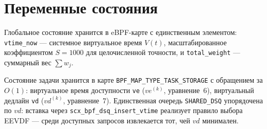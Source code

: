 \documentclass[12pt, oneside]{book}
\newenvironment{customquote}
{\list{}{\leftmargin=0.5cm
                \rightmargin=0.5cm
                \topsep=0pt
                \partopsep=0pt
                \parsep=2pt
                \itemsep=0pt
        }%
        \normalfont\relax
\item\relax}
{\endlist}
\begin{document}
\section{Переменные состояния}
\begin{customquote}
        \quad Глобальное состояние хранится в eBPF-карте с
        единственным элементом: \texttt{vtime\_now} ---
        системное виртуальное время $V(t)$, масштабированное
        коэффициентом $S = 1000$ для целочисленной точности,
        и \texttt{total\_weight} --- суммарный вес $\sum w_j$.

        \quad Состояние задачи хранится в карте
        \texttt{BPF\_MAP\_TYPE\_TASK\_STORAGE} с обращением
        за $O(1)$: виртуальное время доступности \texttt{ve}
        ($ve^{(k)}$, уравнение~6), виртуальный дедлайн
        \texttt{vd} ($vd^{(k)}$, уравнение~7).
        Единственная очередь \texttt{SHARED\_DSQ} упорядочена
        по $vd$: вставка через
        \texttt{scx\_bpf\_dsq\_insert\_vtime} реализует
        правило выбора EEVDF --- среди доступных запросов
        извлекается тот, чей $vd$ минимален.
\end{customquote}
\end{document}
